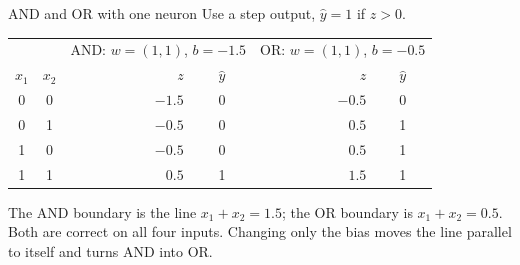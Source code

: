 \documentclass[11pt]{article}
\begin{document}
\begin{example}{AND and OR with one neuron}
Use a step output, $\hat y=1$ if $z>0$.
\begin{center}\small\renewcommand{\arraystretch}{1.2}
\begin{tabular}{cc|rc|rc}\toprule
& & \multicolumn{2}{c|}{AND: $w=(1,1)$, $b=-1.5$} & \multicolumn{2}{c}{OR: $w=(1,1)$, $b=-0.5$}\\
$x_1$ & $x_2$ & $z$ & $\hat y$ & $z$ & $\hat y$\\\midrule
0&0&$-1.5$&0&$-0.5$&0\\
0&1&$-0.5$&0&$0.5$&1\\
1&0&$-0.5$&0&$0.5$&1\\
1&1&$0.5$&1&$1.5$&1\\\bottomrule
\end{tabular}\end{center}
The AND boundary is the line $x_1+x_2=1.5$; the OR boundary is $x_1+x_2=0.5$. Both are correct on all four inputs. Changing only the bias moves the line parallel to itself and turns AND into OR.
\end{example}
\end{document}

